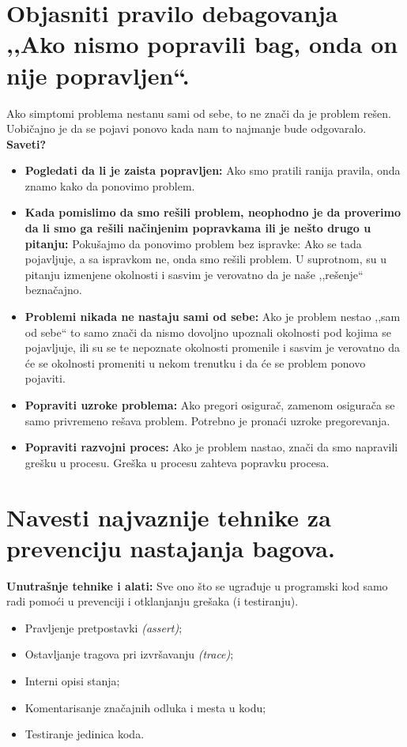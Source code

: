 \documentclass[a4paper]{article}
\begin{document}
\section{Objasniti pravilo debagovanja ,,Ako nismo popravili bag, onda on nije popravljen``.}
  Ako simptomi problema nestanu sami od sebe, to ne znači da je problem rešen. Uobičajno je da se
  pojavi ponovo kada nam to najmanje bude odgovaralo.\\
  \textbf{Saveti?}
  \begin{itemize}
    \item \textbf{Pogledati da li je zaista popravljen:} Ako smo pratili ranija pravila, onda znamo
          kako da ponovimo problem.
    \item \textbf{Kada pomislimo da smo rešili problem, neophodno je da proverimo da li
          smo ga rešili načinjenim popravkama ili je nešto drugo u pitanju:} Pokušajmo da ponovimo
          problem bez ispravke: Ako se tada pojavljuje, a sa ispravkom ne, onda smo rešili problem.
          U suprotnom, su u pitanju izmenjene okolnosti i sasvim je verovatno da je naše ,,rešenje``
          beznačajno. 
    \item \textbf{Problemi nikada ne nastaju sami od sebe:} Ako je problem nestao ,,sam od sebe`` to
          samo znači da nismo dovoljno upoznali okolnosti pod kojima se pojavljuje, ili su se te
          nepoznate okolnosti promenile i sasvim je verovatno da će se okolnosti promeniti u nekom
          trenutku i da će se problem ponovo pojaviti.
    \item \textbf{Popraviti uzroke problema:} Ako pregori osigurač, zamenom osigurača se samo privremeno
          rešava problem. Potrebno je pronaći uzroke pregorevanja. 
    \item \textbf{Popraviti razvojni proces:} Ako je problem nastao, znači da smo napravili grešku
          u procesu. Greška u procesu zahteva popravku procesa.  
  \end{itemize}

\section{Navesti najvaznije tehnike za prevenciju nastajanja bagova.}
  \textbf{Unutrašnje tehnike i alati:} Sve ono što se ugrađuje u programski kod
  samo radi pomoći u prevenciji i otklanjanju grešaka (i testiranju).
  \begin{itemize}
    \item Pravljenje pretpostavki \textit{(assert)};
    \item Ostavljanje tragova pri izvršavanju \textit{(trace)};
    \item Interni opisi stanja;
    \item Komentarisanje značajnih odluka i mesta u kodu;
    \item Testiranje jedinica koda.
  \end{itemize}
\end{document}
